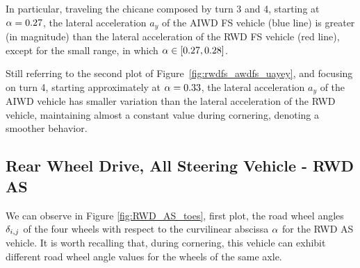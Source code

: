 In particular, traveling the chicane composed by turn 3 and 4, starting at $\alpha = 0.27$, the lateral acceleration $a_y$ of the AIWD FS vehicle (blue line) is greater (in magnitude) than the lateral acceleration of the RWD FS vehicle (red line), except for the small range, in which $\alpha\in[0.27, 0.28]$.

Still referring to the second plot of Figure~\ref{fig:rwdfs_awdfs_uayey}, and  focusing on turn 4, starting approximately at $\alpha = 0.33$, the lateral acceleration $a_y$ of the AIWD vehicle has smaller variation than the lateral acceleration of the RWD vehicle, maintaining almost a constant value during cornering, denoting a smoother behavior.




\subsection{Rear Wheel Drive, All Steering Vehicle - RWD AS}
We can observe in Figure \ref{fig:RWD_AS_toes}, first plot, the road wheel angles $\delta_{i,j}$ of the four wheels with respect to the curvilinear abscissa $\alpha$ for the RWD AS vehicle. It is worth recalling that, during cornering, this vehicle can exhibit different road wheel angle values for the wheels of the same axle.

